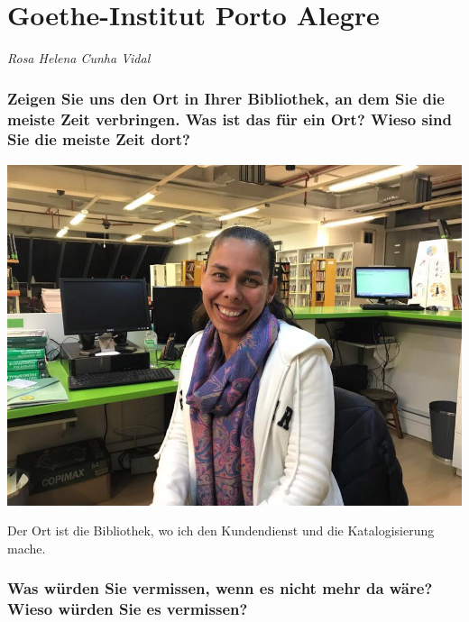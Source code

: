 
\vspace*{.5cm}
\section{Goethe-Institut Porto Alegre}
\begin{center}
\emph{Rosa Helena Cunha Vidal}
\end{center}
\vspace*{1cm}

\hypertarget{zeigen-sie-uns-den-ort-in-ihrer-bibliothek-an-dem-sie-die-meiste-zeit-verbringen.-was-ist-das-fuxfcr-ein-ort-wieso-sind-sie-die-meiste-zeit-dort}{%
\subsubsection*{Zeigen Sie uns den Ort in Ihrer Bibliothek, an dem Sie die
meiste Zeit verbringen. Was ist das für ein Ort? Wieso sind Sie die
meiste Zeit
dort?}\label{zeigen-sie-uns-den-ort-in-ihrer-bibliothek-an-dem-sie-die-meiste-zeit-verbringen.-was-ist-das-fuxfcr-ein-ort-wieso-sind-sie-die-meiste-zeit-dort}}

\begin{center}
\includegraphics{gi-porto-alegre/img/onde-passo.jpg}
\end{center}

Der Ort ist die Bibliothek, wo ich den Kundendienst und die
Katalogisierung mache.

\hypertarget{was-wuxfcrden-sie-vermissen-wenn-es-nicht-mehr-da-wuxe4re-wieso-wuxfcrden-sie-es-vermissen}{%
\subsubsection*{Was würden Sie vermissen, wenn es nicht mehr da wäre? Wieso
würden Sie es
vermissen?}\label{was-wuxfcrden-sie-vermissen-wenn-es-nicht-mehr-da-wuxe4re-wieso-wuxfcrden-sie-es-vermissen}}

